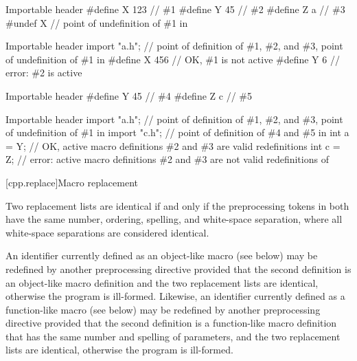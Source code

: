 \pnum
\begin{example}
\begin{codeblocktu}{Importable header }
#define X 123   // \#1
#define Y 45    // \#2
#define Z a     // \#3
#undef X        // point of undefinition of \#1 in 
\end{codeblocktu}

\begin{codeblocktu}{Importable header }
import "a.h";   // point of definition of \#1, \#2, and \#3, point of undefinition of \#1 in 
#define X 456   // OK, \#1 is not active
#define Y 6     // error: \#2 is active
\end{codeblocktu}

\begin{codeblocktu}{Importable header }
#define Y 45    // \#4
#define Z c     // \#5
\end{codeblocktu}

\begin{codeblocktu}{Importable header }
import "a.h";   // point of definition of \#1, \#2, and \#3, point of undefinition of \#1 in 
import "c.h";   // point of definition of \#4 and \#5 in 
int a = Y;      // OK, active macro definitions \#2 and \#3 are valid redefinitions
int c = Z;      // error: active macro definitions \#2 and \#3 are not valid redefinitions of 
\end{codeblocktu}
\end{example}

%

[cpp.replace]{Macro replacement}%
%
%

\pnum
{}%
Two replacement lists are identical if and only if
the preprocessing tokens in both have
the same number, ordering, spelling, and white-space separation,
where all white-space separations are considered identical.

\pnum
An identifier currently defined as an
%
%
object-like macro (see below) may be redefined by another
preprocessing directive provided that the second definition is an
object-like macro definition and the two replacement lists
are identical, otherwise the program is ill-formed.
Likewise, an identifier currently defined as a
%
%
function-like macro (see below) may be redefined by another
preprocessing directive provided that the second definition is a
function-like macro definition that has the same number and spelling
of parameters,
and the two replacement lists are identical,
otherwise the program is ill-formed.

